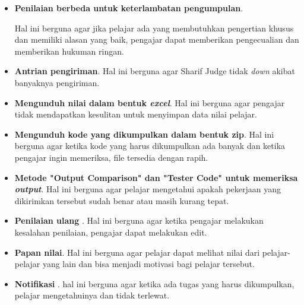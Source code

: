 \begin{itemize}
    \item \textbf{Penilaian berbeda untuk keterlambatan pengumpulan}.
    
    Hal ini berguna agar jika pelajar ada yang membutuhkan pengertian khusus dan memiliki alasan yang baik, pengajar dapat memberikan pengecualian dan memberikan hukuman ringan.
    \item \textbf{Antrian pengiriman}.
    Hal ini berguna agar Sharif Judge tidak \textit{down} akibat banyaknya pengiriman.
    
    \item \textbf{Mengunduh nilai dalam bentuk \textit{excel}}.
    Hal ini berguna agar pengajar tidak mendapatkan kesulitan untuk menyimpan data nilai pelajar.
    
    \item \textbf{Mengunduh kode yang dikumpulkan dalam bentuk zip}.
    Hal ini berguna agar ketika kode yang harus dikumpulkan ada banyak dan ketika pengajar ingin memeriksa, file tersedia dengan rapih. 
    
    \item \textbf{Metode "Output Comparison" dan "Tester Code" untuk memeriksa \textit{output}}.
    Hal ini berguna agar pelajar mengetahui apakah pekerjaan yang dikirimkan tersebut sudah benar atau masih kurang tepat. 
    
    \item \textbf{Penilaian ulang }.
    Hal ini berguna agar ketika pengajar melakukan kesalahan penilaian, pengajar dapat melakukan edit.
    \item \textbf{Papan nilai}.
    Hal ini berguna agar pelajar dapat melihat nilai dari pelajar-pelajar yang lain dan bisa menjadi motivasi bagi pelajar tersebut. 
    \item \textbf{Notifikasi }.
    hal ini berguna agar ketika ada tugas yang harus dikumpulkan, pelajar mengetahuinya dan tidak terlewat.
\end{itemize}

